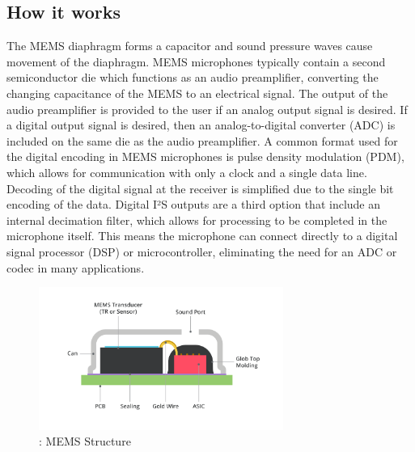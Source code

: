 \subsection{How it works}
The MEMS diaphragm forms a capacitor and sound pressure waves cause movement of the diaphragm. MEMS microphones typically contain a second semiconductor die which functions as an audio preamplifier, converting the changing capacitance of the MEMS to an electrical signal. The output of the audio preamplifier is provided to the user if an analog output signal is desired. If a digital output signal is desired, then an analog-to-digital converter (ADC) is included on the same die as the audio preamplifier. A common format used for the digital encoding in MEMS microphones is pulse density modulation (PDM), which allows for communication with only a clock and a single data line. Decoding of the digital signal at the receiver is simplified due to the single bit encoding of the data. Digital I²S outputs are a third option that include an internal decimation filter, which allows for processing to be completed in the microphone itself. This means the microphone can connect directly to a digital signal processor (DSP) or microcontroller, eliminating the need for an ADC or codec in many applications.
\begin{figure}[H]
    \centering
    \includegraphics[width=8cm]{LiveAudioWatermarking/images/MEMS.png}
    \caption{: MEMS Structure}
    \label{fig:MEMS}
\end{figure}


